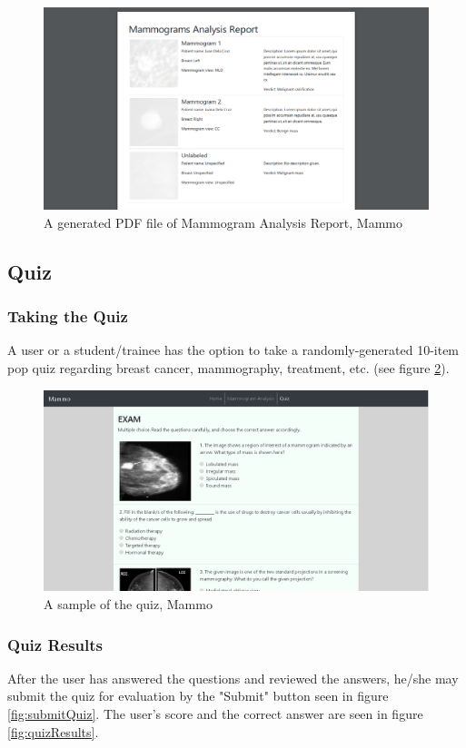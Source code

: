 \begin{figure}[h]
	\centering
  	\includegraphics[scale=0.5]{images/mammogramPDF.png}
	 \caption{A generated PDF file of Mammogram Analysis Report, Mammo}
  	\label{fig:mammogramPDF}
\end{figure}

\subsection{Quiz}

\subsubsection{Taking the Quiz}
\qquad A user or a student/trainee has the option to take a randomly-generated 10-item pop quiz regarding breast cancer, mammography, treatment, etc. (see figure \ref{fig:mammogramExam}).

\begin{figure}[h]
	\centering
  	\includegraphics[scale=0.5]{images/mammogramExam.png}
	 \caption{A sample of the quiz, Mammo}
  	\label{fig:mammogramExam}
\end{figure}

\subsubsection{Quiz Results}
\qquad After the user has answered the questions and reviewed the answers, he/she may submit the quiz for evaluation by the "Submit" button seen in figure \ref{fig:submitQuiz}. The user's score and the correct answer are seen in figure \ref{fig:quizResults}.

